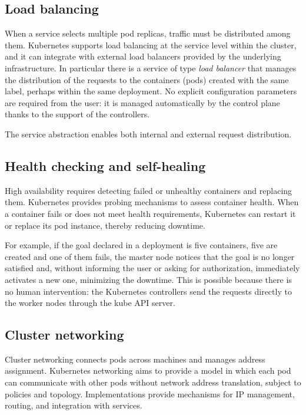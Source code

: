 \subsection{Load balancing}

When a service selects multiple pod replicas, traffic must be distributed among them. Kubernetes supports load balancing at the service level within the cluster, and it can integrate with external load balancers provided by the underlying infrastructure. In particular there is a service of type \emph{load balancer} that manages the distribution of the requests to the containers (pods) created with the same label, perhaps within the same deployment. No explicit configuration parameters are required from the user: it is managed automatically by the control plane thanks to the support of the controllers.

The service abstraction enables both internal and external request distribution.

\subsection{Health checking and self-healing}

High availability requires detecting failed or unhealthy containers and replacing them. Kubernetes provides probing mechanisms to assess container health. When a container fails or does not meet health requirements, Kubernetes can restart it or replace its pod instance, thereby reducing downtime.

For example, if the goal declared in a deployment is five containers, five are created and one of them fails, the master node notices that the goal is no longer satisfied and, without informing the user or asking for authorization, immediately activates a new one, minimizing the downtime. This is possible because there is no human intervention: the Kubernetes controllers send the requests directly to the worker nodes through the kube API server.

\subsection{Cluster networking}

Cluster networking connects pods across machines and manages address assignment. Kubernetes networking aims to provide a model in which each pod can communicate with other pods without network address translation, subject to policies and topology. Implementations provide mechanisms for IP management, routing, and integration with services.

